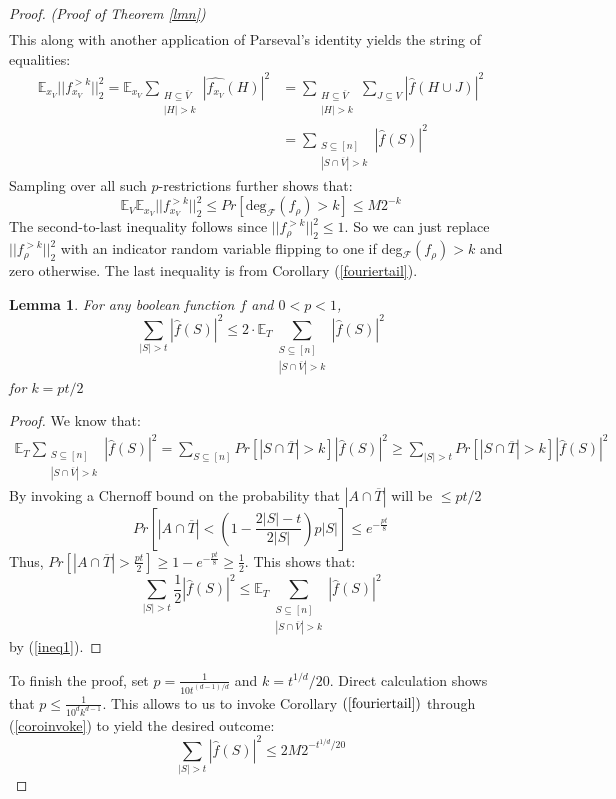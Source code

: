 \documentclass{amsart}
\newtheorem{lemma}[theorem]{Lemma}
\theoremstyle{definition}
\theoremstyle{remark}
\numberwithin{equation}{section}
\theoremstyle{remark}
\begin{document}
\begin{proof}{\emph{(Proof of Theorem \ref{lmn})}}
\begin{align}
\end{align}
%
This along with another application of Parseval's identity yields the string of equalities: \newline
\begin{align}
  \mathbb{E}_{x_V}||f^{>k}_{x_V}||_2^2 = \mathbb{E}_{x_V}\sum_{\substack {H \subseteq \overline{V} \\ |H| > k}} |\widehat{f_{x_V}}(H)|^2
  & = \sum_{\substack {H \subseteq \overline{V} \\ |H| > k}} \sum_{J \subseteq V} |\hat{f}(H \cup J)|^2 \\
  & = \sum_{ \substack {S \subseteq [n] \\ |S \cap \overline{V}| > k}} |\hat{f}(S)|^2
\end{align}
%
Sampling over all such $p$-restrictions further shows that:
\begin{equation} \label{coroinvoke}
  \mathbb{E}_V\mathbb{E}_{x_V} ||f^{>k}_{x_V}||_2^2 \leq Pr[\text{deg}_{\mathcal{F}}(f_\rho) > k] \leq M2^{-k}
\end{equation}
The second-to-last inequality follows since $||f_\rho^{>k}||_2^2 \leq 1$. So we can just replace $||f_\rho^{>k}||_2^2$ with an indicator random variable flipping to one if deg$_{\mathcal{F}}(f_\rho) > k$ and zero otherwise. The last inequality is from Corollary (\ref{fouriertail}).
%
\begin{lemma}
  For any boolean function $f$ and $0 < p < 1$,
  $$ \sum_{|S| > t} |\hat{f}(S)|^2 \leq 2 \cdot \mathbb{E}_T \sum_{ \substack {S \subseteq [n] \\ |S \cap \overline{V}| > k}} |\hat{f}(S)|^2 $$
  for $k = pt/2$
\end{lemma}
%
\begin{proof}
  We know that:
  \begin{align} \label{ineq1}
    \mathbb{E}_T\sum_{ \substack {S \subseteq [n] \\ |S \cap \overline{V}| > k}} |\hat{f}(S)|^2 = \sum_{S \subseteq [n]} Pr[|S \cap \overline{T}| > k]|\hat{f}(S)|^2 \geq \sum_{|S| > t} Pr[|S \cap \overline{T}| > k]|\hat{f}(S)|^2
  \end{align}
  By invoking a Chernoff bound on the probability that $|A \cap \overline{T}|$ will be $\leq pt/2$
  $$  Pr[|A \cap \overline{T}| < (1- \frac{2|S| - t}{2|S|})p|S|] \leq  e^{-\frac{pt }{8}}$$ Thus, $Pr[|A \cap \overline{T}| > \frac{pt}{2}] \geq 1 - e^{-\frac{pt }{8}} \geq \frac{1}{2}$. This shows that:
    $$ \sum_{|S| > t} \frac{1}{2}|\hat{f}(S)|^2 \leq \mathbb{E}_T \sum_{ \substack {S \subseteq [n] \\ |S \cap \overline{V}| > k}} |\hat{f}(S)|^2 $$ by (\ref{ineq1}).
\end{proof}
\noindent To finish the proof, set $p = \frac{1}{10t^{(d-1)/d}}$ and $k = t^{1/d}/20$. Direct calculation shows that $p \leq \frac{1}{10^dk^{d-1}}$. This allows to us to invoke Corollary $(\ref{fouriertail})$ through (\ref{coroinvoke}) to yield the desired outcome:
\begin{equation}
  \sum_{|S| > t} |\hat{f}(S)|^2 \leq 2M2^{-t^{1/d}/20}
\end{equation}
\end{proof}
\end{document}
